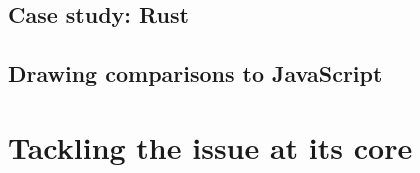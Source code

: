 \subsection{Case study: Rust}



\subsection{Drawing comparisons to JavaScript}



\section{Tackling the issue at its core}
